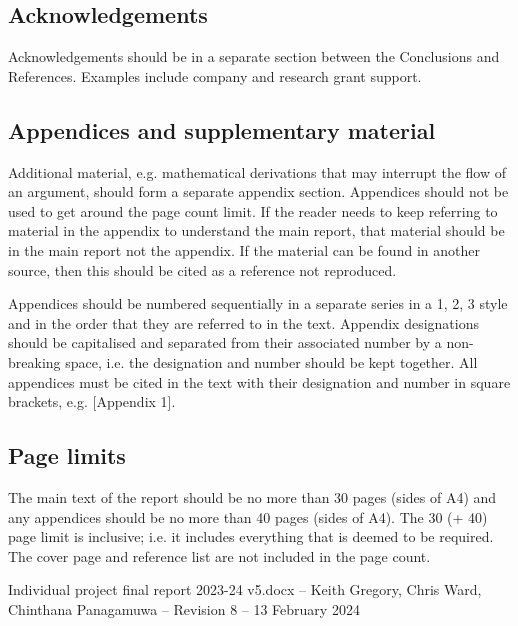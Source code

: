 \documentclass[12pt]{article}
\begin{document}
\hypertarget{acknowledgements}{%
\subsection{\texorpdfstring{
Acknowledgements}{ Acknowledgements}}\label{acknowledgements}}

Acknowledgements should be in a separate section between the Conclusions
and References. Examples include company and research grant support.

\hypertarget{appendices-and-supplementary-material}{%
\subsection{Appendices and supplementary
material}\label{appendices-and-supplementary-material}}

Additional material, e.g. mathematical derivations that may interrupt
the flow of an argument, should form a separate appendix section.
Appendices should not be used to get around the page count limit. If the
reader needs to keep referring to material in the appendix to understand
the main report, that material should be in the main report not the
appendix. If the material can be found in another source, then this
should be cited as a reference not reproduced.

Appendices should be numbered sequentially in a separate series in a 1,
2, 3 style and in the order that they are referred to in the text.
Appendix designations should be capitalised and separated from their
associated number by a non-breaking space, i.e. the designation and
number should be kept together. All appendices must be cited in the text
with their designation and number in square brackets, e.g. {[}Appendix
1{]}.

\hypertarget{page-limits}{%
\subsection{Page limits}\label{page-limits}}

The main text of the report should be no more than 30 pages (sides of
A4) and any appendices should be no more than 40 pages (sides of A4).
The 30 (+ 40) page limit is inclusive; i.e. it includes everything that
is deemed to be required. The cover page and reference list are not
included in the page count.

Individual project final report 2023-24 v5.docx -- Keith Gregory, Chris
Ward, Chinthana Panagamuwa -- Revision 8 -- 13 February 2024
\end{document}
